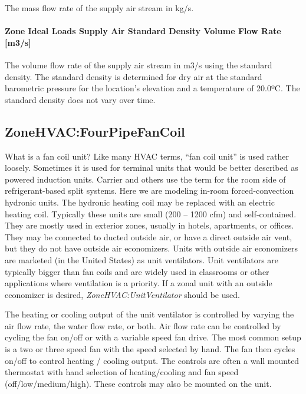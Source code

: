 The mass flow rate of the supply air stream in kg/s.

\paragraph{Zone Ideal Loads Supply Air Standard Density Volume Flow Rate {[}m3/s{]}}\label{zone-ideal-loads-supply-air-standard-density-volume-flow-rate-m3s}

The volume flow rate of the supply air stream in m3/s using the standard density. The standard density is determined for dry air at the standard barometric pressure for the location's elevation and a temperature of 20.0ºC. The standard density does not vary over time.

\subsection{ZoneHVAC:FourPipeFanCoil}\label{zonehvacfourpipefancoil}

What is a fan coil unit? Like many HVAC terms, ``fan coil unit'' is used rather loosely. Sometimes it is used for terminal units that would be better described as powered induction units. Carrier and others use the term for the room side of refrigerant-based split systems. Here we are modeling in-room forced-convection hydronic units. The hydronic heating coil may be replaced with an electric heating coil. Typically these units are small (200 -- 1200 cfm) and self-contained. They are mostly used in exterior zones, usually in hotels, apartments, or offices. They may be connected to ducted outside air, or have a direct outside air vent, but they do not have outside air economizers. Units with outside air economizers are marketed (in the United States) as unit ventilators. Unit ventilators are typically bigger than fan coils and are widely used in classrooms or other applications where ventilation is a priority. If a zonal unit with an outside economizer is desired, \emph{ZoneHVAC:UnitVentilator} should be used.

The heating or cooling output of the unit ventilator is controlled by varying the air flow rate, the water flow rate, or both. Air flow rate can be controlled by cycling the fan on/off or with a variable speed fan drive. The most common setup is a two or three speed fan with the speed selected by hand. The fan then cycles on/off to control heating / cooling output. The controls are often a wall mounted thermostat with hand selection of heating/cooling and fan speed (off/low/medium/high). These controls may also be mounted on the unit.

